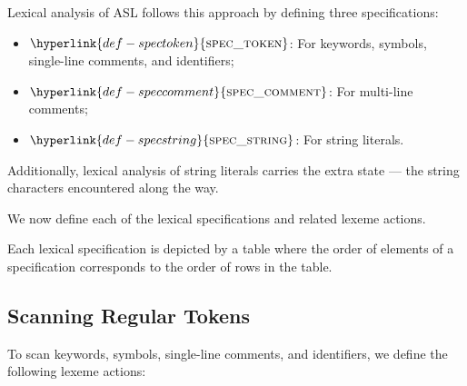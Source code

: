 \documentclass{book}
\newcommand\spectoken[0]{\hyperlink{def-spectoken}{\textsc{spec\_token}}}
\newcommand\specstring[0]{\hyperlink{def-specstring}{\textsc{spec\_string}}}
\newcommand\speccomment[0]{\hyperlink{def-speccomment}{\textsc{spec\_comment}}}
\begin{document}
Lexical analysis of ASL follows this approach by defining three specifications:
\begin{itemize}
  \item $\spectoken$: For keywords, symbols, single-line comments, and identifiers;
  \item $\speccomment$: For multi-line comments;
  \item $\specstring$: For string literals.
\end{itemize}

Additionally, lexical analysis of string literals carries the extra state ---
the string characters encountered along the way.

We now define each of the lexical specifications and related lexeme actions.

Each lexical specification is depicted by a table where the order of elements
of a specification corresponds to the order of rows in the table.

\subsection{Scanning Regular Tokens}
To scan keywords, symbols, single-line comments, and identifiers,
we define the following lexeme actions:
\end{document}
